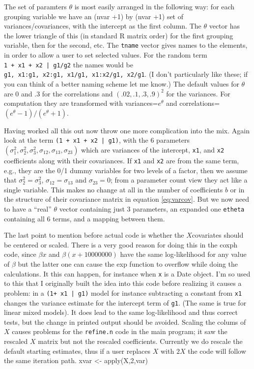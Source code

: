 \documentclass{article}
\begin{document}
The set of paramters $\theta$ is most easily arranged in the
following way:
for each grouping variable we have an 
(nvar +1) by (nvar +1) set of variances/covariances, with the
intercept as the first column.
The $\theta$ vector has the lower triangle of this (in standard R
matrix order) for the first grouping variable, then for the second, 
etc.
The {\tt{}tname} vector gives names to the elements, in
order to allow a user to set selected values.
For the random term {\tt{}1\ +\ x1\ +\ x2\ |\ g1/g2} the names would be
{\tt{}g1,\ x1:g1,\ x2:g1,\ x1/g1,\ x1:x2/g1,\ x2/g1}. 
(I don't particularly like these;  %
if you can think of a better naming scheme let me know.)
The default values for $\theta$ are 0 and .3 for the correlations and 
$(.02, .1, .3, .9)^2$ for the variances.
For computation they are transformed with variances=$e^\theta$ and
correlations=$(e^\theta -1)/(e^\theta +1)$.

Having worked all this out now throw one more complication into the mix. 
Again look at the term {\tt{}(1\ +\ x1\ +\ x2\ |\ g1)}, with the 6 parameters
$(\sigma_1^2, \sigma_2^2, \sigma_3^2, \sigma_{12}, \sigma_{13}, \sigma_{23})$
which are variances of the intercept, {\tt{}x1}, and {\tt{}x2} coefficients along
with their covariances.  
If {\tt{}x1} and {\tt{}x2} are from the same term, e.g., they are the 0/1 dummy variables
for two levels of a factor, then we assume that $\sigma_2^2= \sigma_3^2$,
$\sigma_{12}=\sigma_{13}$ and $\sigma_{23}=0$; 
from a parameter count view they act like a single variable.
This makes no change at all in the number of coefficients $b$ or in the 
structure of their covariance matrix in equation \ref{eq:varcov}.
But we now need to have a ``real'' $\theta$ vector containing just 3 parameters,
an expanded one {\tt{}etheta} containing all 6 terms, and a mapping between them.

The last point to mention before actual code is whether the $X$covariates should
be centered or scaled.  There is a very good reason for doing this in the
coxph code, since $\beta x$ and $\beta (x+ 10000000)$ have the same log-likelihood 
for any value of $\beta$ but the latter one can cause the exp function to overflow
while doing the calculations.  It this can happen, for instance when {\tt{}x} is a
Date object.  I'm so used to this that I originally built the idea into this code
before realizing it causes a problem: in a {\tt{}(1+\ x1\ |\ g1)} model for instance
subtracting a constant from {\tt{}x1} changes the variance estimate for the
intercept term of {\tt{}g1}.
(The same is true for linear mixed models).
It does lead to the same log-likelihood and thus correct tests, but the
change in printed output should be avoided.
Scaling the colums of $X$ causes problems for
the {\tt{}refine.n} code in the main program; it saw the rescaled
$X$ matrix but not the rescaled coefficients.  
Currently we do rescale the default starting estimates, thus if a user replaces
$X$ with $2X$ the code will follow the same iteration path.
\nwenddocs{}\endmoddef
xvar  <- apply(X,2,var)
\end{document}
